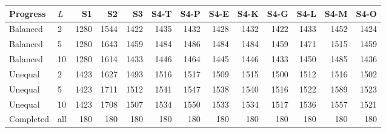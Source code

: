 \begin{tabular}{llrrrrrrrrrrr}\toprule
Progress & $L$ & S1 & S2 & S3 & S4-T & S4-P & S4-E & S4-K & S4-G & S4-L & S4-M & S4-O\\\midrule
Balanced & 2 & 1280 & 1544 & 1422 & 1435 & 1432 & 1428 & 1432 & 1422 & 1433 & 1452 & 1424\\
Balanced & 5 & 1280 & 1643 & 1459 & 1484 & 1486 & 1484 & 1484 & 1459 & 1471 & 1515 & 1459\\
Balanced & 10 & 1280 & 1614 & 1433 & 1446 & 1464 & 1445 & 1446 & 1433 & 1450 & 1485 & 1436\\
Unequal & 2 & 1423 & 1627 & 1493 & 1516 & 1517 & 1509 & 1515 & 1500 & 1512 & 1516 & 1502\\
Unequal & 5 & 1423 & 1711 & 1512 & 1541 & 1547 & 1538 & 1540 & 1516 & 1522 & 1589 & 1523\\
Unequal & 10 & 1423 & 1708 & 1507 & 1534 & 1550 & 1533 & 1534 & 1517 & 1536 & 1557 & 1521\\
\midrule
Completed & all & 180 & 180 & 180 & 180 & 180 & 180 & 180 & 180 & 180 & 180 & 180\\
\bottomrule\end{tabular}
